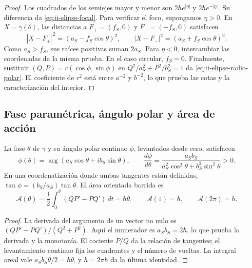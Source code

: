 \begin{proof}
Los cuadrados de los semiejes mayor y menor son
\(2\hbar e^{|\eta|}\) y \(2\hbar e^{-|\eta|}\). Su diferencia
da \eqref{eq:ii-elipse-focal}. Para verificar el foco, supongamos
\(\eta>0\). En \(X=\gamma(\theta)\), las distancias a
\(F_+=(f_S,0)\) y \(F_-=(-f_S,0)\) satisfacen
\[
 |X-F_+|^2=(a_S-f_S\cos\theta)^2,\qquad
 |X-F_-|^2=(a_S+f_S\cos\theta)^2.
\]
Como \(a_S>f_S\), sus raíces positivas suman \(2a_S\).
Para \(\eta<0\), intercambiar las coordenadas da la misma prueba.
En el caso circular, \(f_S=0\). Finalmente, sustituir
\((Q,P)=r(\cos\phi,\sin\phi)\) en
\(Q^2/a_S^2+P^2/b_S^2=1\) da
\eqref{eq:ii-elipse-radio-polar}. El coeficiente de \(r^2\) está
entre \(a^{-2}\) y \(b^{-2}\), lo que prueba las cotas y la
caracterización del interior.
\end{proof}

\subsection{Fase paramétrica, ángulo polar y área de acción}
\label{sec:ii-elipse-fase-area}

\begin{proposition}
\label{prop:ii-elipse-area}
La fase \(\theta\) de \(\gamma\) y su ángulo polar continuo
\(\phi\), levantados desde cero, satisfacen
\begin{equation}
 \phi(\theta)=\arg(a_S\cos\theta+i b_S\sin\theta),\qquad
 \frac{d\phi}{d\theta}
 =\frac{a_Sb_S}{a_S^2\cos^2\theta+b_S^2\sin^2\theta}>0.
 \label{eq:ii-elipse-fases}
\end{equation}
En una coordenatización donde ambas tangentes están definidas,
\(\tan\phi=(b_S/a_S)\tan\theta\). El área orientada barrida es
\begin{equation}
 \mathcal A(\theta)=\frac12\int_0^\theta(QP'-PQ')\,dt
 =\hbar\theta,\qquad
 \mathcal A(1)=\hbar,\qquad \mathcal A(2\pi)=h.
 \label{eq:ii-elipse-area-fase}
\end{equation}
\end{proposition}

\begin{proof}
La derivada del argumento de un vector no nulo es
\((QP'-PQ')/(Q^2+P^2)\). Aquí el numerador es
\(a_Sb_S=2\hbar\), lo que prueba la derivada y la monotonía.
El cociente \(P/Q\) da la relación de tangentes; el levantamiento
continuo fija los cuadrantes y el número de vueltas. La integral areal
vale \(a_Sb_S\theta/2=\hbar\theta\), y
\(h=2\pi\hbar\) da la última identidad.
\end{proof}

